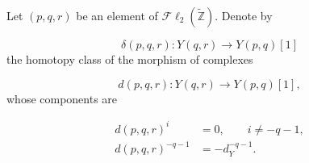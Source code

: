 Let $(p,q,r)$ be an element of
$\mathcal{F}\ell_2(\widetilde{\mathbb Z})$. Denote by

\begin{equation}
\delta(p,q,r)\colon Y(q,r)\longrightarrow Y(p,q)[1]
\tag{4.1.2.6}
\end{equation}
the homotopy class of the morphism of complexes

\begin{equation}
d(p,q,r)\colon Y(q,r)\longrightarrow Y(p,q)[1],
\tag{4.1.2.7}
\end{equation}
whose components are

\begin{equation}
\begin{aligned}
d(p,q,r)^i&=0,\qquad i\neq-q-1,\\
d(p,q,r)^{-q-1}&=-d_Y^{-q-1}.
\end{aligned}
\tag{4.1.2.8}
\end{equation}
\endgroup
